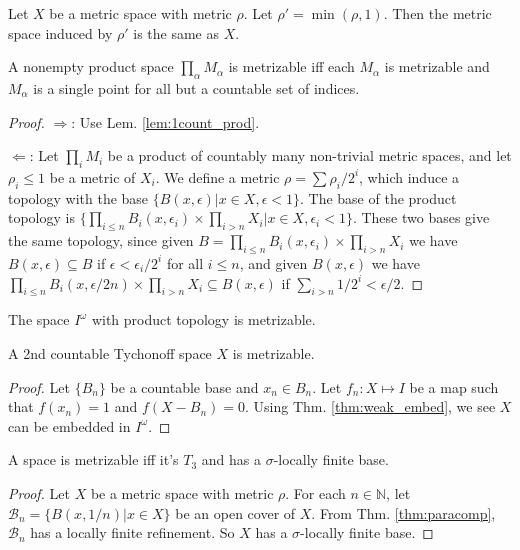 \documentclass[12pt]{book}
\begin{document}
\begin{lemma}
	Let $X$ be a metric space with metric $\rho$. Let $\rho'=\min(\rho,1)$. Then the metric space induced by $\rho'$ is the same as $X$.
\end{lemma}

\begin{lemma}
	A nonempty product space $\prod_\alpha M_\alpha$ is metrizable iff each $M_\alpha$ is metrizable and $M_\alpha$ is a single point for all but a countable set of indices.
\end{lemma}
\begin{proof}
	$\Rightarrow$: Use Lem. \ref{lem:1count_prod}.
	
	$\Leftarrow$: Let $\prod_i M_i$ be a product of countably many non-trivial metric spaces, and let $\rho_i\leq 1$ be a metric of $X_i$. We define a metric $\rho=\sum\rho_i/2^i$, which induce a topology with the base $\{B(x,\epsilon)|x\in X,\epsilon<1\}$. The base of the product topology is $\{\prod_{i\leq n}B_i(x,\epsilon_i)\times\prod_{i>n}X_i|x\in X,\epsilon_i<1\}$. These two bases give the same topology, since given $B=\prod_{i\leq n}B_i(x,\epsilon_i)\times\prod_{i>n}X_i$ we have $B(x,\epsilon)\subseteq B$ if $\epsilon<\epsilon_i/2^i$ for all $i\leq n$, and given $B(x,\epsilon)$ we have $\prod_{i\leq n}B_i(x,\epsilon/2n)\times\prod_{i>n}X_i\subseteq B(x,\epsilon)$ if $\sum_{i>n}1/2^i<\epsilon/2$.
\end{proof}
\begin{corollary}
	The space $I^{\omega}$ with product topology is metrizable.
\end{corollary}

\begin{theorem}[Urysohn]
	A 2nd countable Tychonoff space $X$ is metrizable.
\end{theorem}
\begin{proof}
	Let $\{B_n\}$ be a countable base and $x_n\in B_n$. Let $f_n:X\mapsto I$ be a map such that $f(x_n)=1$ and $f(X-B_n)=0$. Using Thm. \ref{thm:weak_embed}, we see $X$ can be embedded in $I^{\omega}$.
\end{proof}

\begin{theorem}
	A space is metrizable iff it's $T_3$ and has a $\sigma$-locally finite base.
\end{theorem}

\begin{proof}
	Let $X$ be a metric space with metric $\rho$. For each $n\in \mathbb N$, let $\mathcal B_n=\{B(x,1/n)|x\in X\}$ be an open cover of $X$. From Thm. \ref{thm:paracomp}, $\mathcal B_n$ has a locally finite refinement. So $X$ has a $\sigma$-locally finite base.
\end{proof}
\end{document}

